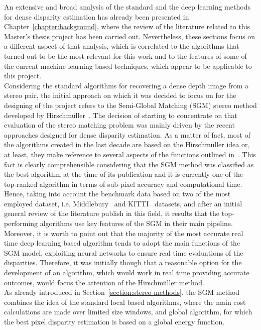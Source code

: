 An extensive and broad analysis of the standard and the deep learning methods for dense disparity estimation has already been presented in Chapter~\ref{chapter:background}, where the review of the literature related to this Master's thesis project has been carried out.
Nevertheless, these sections focus on a different aspect of that analysis, which is correlated to the algorithms that turned out to be the most relevant for this work and to the features of some of the current machine learning based techniques, which appear to be applicable to this project.\\
Considering the standard algorithms for recovering a dense depth image from a stereo pair, the initial approach on which it was decided to focus on for the designing of the project refers to the Semi-Global Matching (SGM) stereo method developed by Hirschm\"{u}ller~\cite{Hirschmuller2008}.
The decision of starting to concentrate on that evaluation of the stereo matching problem was mainly driven by the recent approaches designed for dense disparity estimation.
As a matter of fact, most of the algorithms created in the last decade are based on the Hirschm\"{u}ller idea or, at least, they make reference to several aspects of the functions outlined in~\cite{Hirschmuller2008}.
This fact is clearly comprehensible considering that the SGM method was classified as the best algorithm at the time of its publication and it is currently one of the top-ranked algorithm in terms of sub-pixel accuracy and computational time.
Hence, taking into account the benchmark data based on two of the most employed dataset, i.e. Middlebury~\cite{Scharstein2014} and KITTI~\cite{geiger2013vision} datasets, and after an initial general review of the literature publish in this field, it results that the top-performing algorithms use key features of the SGM in their main pipeline. 
Moreover, it is worth to point out that the majority of the most accurate real time deep learning based algorithm tends to adopt the main functions of the SGM model, exploiting neural networks to ensure real time evaluations of the disparities.
Therefore, it was initially though that a reasonable option for the development of an algorithm, which would work in real time providing accurate outcomes, would focus the attention of the Hirschm\"{u}ller method.\\
As already introduced in Section~\ref{section:stereo-methods}, the SGM method combines the idea of the standard local based algorithms, where the main cost calculations are made over limited size windows, and global algorithm, for which the best pixel disparity estimation is based on a global energy function. 

